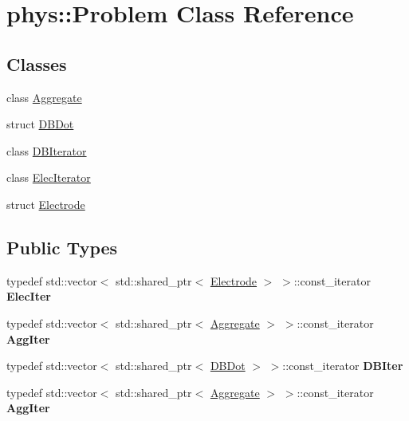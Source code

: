 \hypertarget{classphys_1_1Problem}{}\section{phys\+:\+:Problem Class Reference}
\label{classphys_1_1Problem}
\subsection*{Classes}
\begin{DoxyCompactItemize}
\item 
class \hyperlink{classphys_1_1Problem_1_1Aggregate}{Aggregate}
\item 
struct \hyperlink{structphys_1_1Problem_1_1DBDot}{D\+B\+Dot}
\item 
class \hyperlink{classphys_1_1Problem_1_1DBIterator}{D\+B\+Iterator}
\item 
class \hyperlink{classphys_1_1Problem_1_1ElecIterator}{Elec\+Iterator}
\item 
struct \hyperlink{structphys_1_1Problem_1_1Electrode}{Electrode}
\end{DoxyCompactItemize}
\subsection*{Public Types}
\begin{DoxyCompactItemize}
\item 
typedef std\+::vector$<$ std\+::shared\+\_\+ptr$<$ \hyperlink{structphys_1_1Problem_1_1Electrode}{Electrode} $>$ $>$\+::const\+\_\+iterator {\bfseries Elec\+Iter}\hypertarget{classphys_1_1Problem_a2352ad07dfa64410e018a8e22007d2bf}{}\label{classphys_1_1Problem_a2352ad07dfa64410e018a8e22007d2bf}

\item 
typedef std\+::vector$<$ std\+::shared\+\_\+ptr$<$ \hyperlink{classphys_1_1Problem_1_1Aggregate}{Aggregate} $>$ $>$\+::const\+\_\+iterator {\bfseries Agg\+Iter}\hypertarget{classphys_1_1Problem_a20409f37c9e0eb02a7ce0452ed8e3e28}{}\label{classphys_1_1Problem_a20409f37c9e0eb02a7ce0452ed8e3e28}

\item 
typedef std\+::vector$<$ std\+::shared\+\_\+ptr$<$ \hyperlink{structphys_1_1Problem_1_1DBDot}{D\+B\+Dot} $>$ $>$\+::const\+\_\+iterator {\bfseries D\+B\+Iter}\hypertarget{classphys_1_1Problem_a88c5e6843679d93f87d29529ccac27e8}{}\label{classphys_1_1Problem_a88c5e6843679d93f87d29529ccac27e8}

\item 
typedef std\+::vector$<$ std\+::shared\+\_\+ptr$<$ \hyperlink{classphys_1_1Problem_1_1Aggregate}{Aggregate} $>$ $>$\+::const\+\_\+iterator {\bfseries Agg\+Iter}\hypertarget{classphys_1_1Problem_a20409f37c9e0eb02a7ce0452ed8e3e28}{}\label{classphys_1_1Problem_a20409f37c9e0eb02a7ce0452ed8e3e28}

\end{DoxyCompactItemize}
